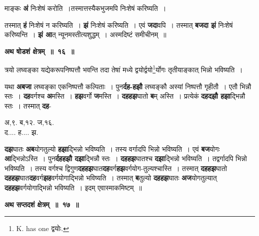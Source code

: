 \documentclass[11pt, openany]{book}
\begin{document}
\noindent माङ्कः \textbf{अं} निःशेषं करोति~।तस्मात्तस्यैकभुजमपि निःशेषं करिष्यति~।

\newpage
\noindent तस्मात् \textbf{हं} निःशेषं न करिष्यति~। \textbf{झं} निःशेषं करिष्यति~। एवं \textbf{जदा}वपि~। तस्मात् \textbf{बजदा झं} निःशेषं करिष्यन्ति~। \textbf{झं आ}त् न्यूनमस्तीत्यशुद्धम्~। अस्मदिष्टं समीचीनम्~॥
\vspace{2mm}

\begin{center}
\textbf{\large अथ षोडशं क्षेत्रम्~॥~१६~॥}
\end{center}

{\ab  त्रयो लघ्वङ्का यद्येकरूपनिष्पत्तौ भवन्ति तदा तेषां मध्ये द्वयोर्द्वयो\renewcommand{\thefootnote}{१}\footnote{{\en K. has one} द्वयोः.}र्योगः तृतीयाङ्कात् भिन्नो भविष्यति~। }

\begin{flushleft}
\begin{minipage}[t]{0.65\textwidth}
\hspace{4mm} यथा \textbf{अबजा} लघ्वङ्का एकनिष्पत्तौ कल्पिताः~। पुन\textbf{र्दह-हझौ} लघ्वङ्कौ अस्यां निष्पत्तौ गृहीतौ~। एतौ भिन्नौ स्तः~।  \textbf{दह}वर्गश्च \textbf{अ}मस्ति~। \textbf{हझ}वर्गो \textbf{ज}मस्ति~।  \textbf{दहहझ}घातो \textbf{ब}म् अस्ति~। प्रत्येकं \textbf{दहदझौ हझा}द्भिन्नौ स्तः~। तस्मात् \textbf{दह}-
\end{minipage} 
\hfill
\begin{minipage}[t]{0.25\textwidth}
अ,९. ब,१२. ज,१६.\\ 
द.... ह.... झ.
\end{minipage}
\end{flushleft}
\vspace{-3mm}

\noindent \textbf{दझ}घातः \textbf{अब}योगतुल्यो \textbf{हझा}द्भिन्नो भविष्यति~। तस्य वर्गादपि भिन्नो भविष्यति~। एवं \textbf{बज}योगः \textbf{आ}द्भिन्नोऽस्ति~। पुन\textbf{र्दहहझौ दझा}द्भिन्नौ स्तः~। \textbf{दहहझ}घातश्च \textbf{दझा}द्भिन्नो भविष्यति~। तद्वर्गादपि भिन्नो भविष्यति~। तस्य वर्गश्च द्विगुण\textbf{दहहझ}घात\textbf{दह}वर्ग\textbf{हझ}वर्गयोग-तुल्यश्चास्ति~। तस्मात्  \textbf{दहहझ}घातो \textbf{दहहझ}घात\textbf{दह}वर्ग\textbf{झह}वर्गयोगाद्भिन्नो भविष्यति~। तस्मात् \textbf{ब}तुल्यो \textbf{दहहझ}घातः \textbf{अज}योगतुल्यात् \textbf{दहहझ}वर्गयोगाद्भिन्नो भविष्यति~। इदम् एवास्माकमिष्टम्~॥ 
\vspace{2mm}

\begin{center}
\textbf{\large अथ सप्तदशं क्षेत्रम्~॥~१७~॥} 
\end{center}
 
\end{document}
